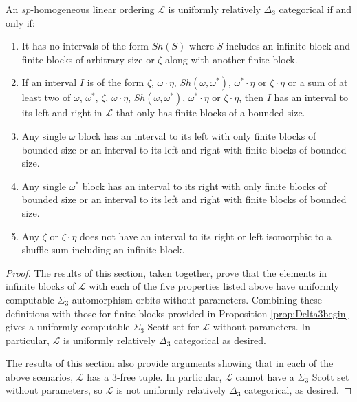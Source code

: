 \documentclass[11pt]{amsart}
\theoremstyle{definition}
\def\L{\mathcal L}
\begin{document}
    \begin{theorem} \label{spud3cat}
        An $sp$-homogeneous linear ordering $\L$ is uniformly relatively $\Delta_3$ categorical if and only if: 
        \begin{enumerate}
            \item It has no intervals of the form $Sh(S)$ where $S$ includes an infinite block and finite blocks of arbitrary size or $\zeta$ along with another finite block.
            \item If an interval $I$ is of the form $\zeta$, $\omega\cdot\eta$, $Sh(\omega,\omega^*)$, $\omega^*\cdot\eta$ or $\zeta\cdot\eta$ or a sum of at least two of $\omega$, $\omega^*$, $\zeta$, $\omega\cdot\eta$, $Sh(\omega,\omega^*)$, $\omega^*\cdot\eta$ or $\zeta\cdot\eta$, then $I$ has an interval to its left and right in $\L$ that only has finite blocks of a bounded size.
            \item Any single $\omega$ block has an interval to its left with only finite blocks of bounded size or an interval to its left and right with finite blocks of bounded size.
            \item Any single $\omega^*$ block has an interval to its right with only finite blocks of bounded size or an interval to its left and right with finite blocks of bounded size.
            \item Any $\zeta$ or $\zeta\cdot\eta$ does not have an interval to its right or left isomorphic to a shuffle sum including an infinite block.
        \end{enumerate}
    \end{theorem}

    \begin{proof}
        The results of this section, taken together, prove that the elements in infinite blocks of $\L$ with each of the five properties listed above have uniformly computable $\Sigma_3$ automorphism orbits without parameters.
        Combining these definitions with those for finite blocks provided in Proposition \ref{prop:Delta3begin} gives a uniformly computable $\Sigma_3$ Scott set for $\L$ without parameters.
        In particular, $\L$ is uniformly relatively $\Delta_3$ categorical as desired.

        The results of this section also provide arguments showing that in each of the above scenarios, $\L$ has a $3$-free tuple.
        In particular, $\L$ cannot have a $\Sigma_3$ Scott set without parameters, so $\L$ is not uniformly relatively $\Delta_3$ categorical, as desired.
    \end{proof}
\end{document}

